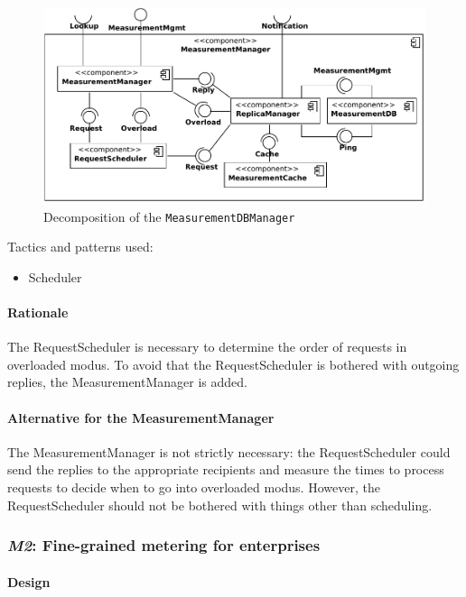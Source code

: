 \documentclass[a4paper,10pt]{article}
\begin{document}
\begin{figure}[!htp]
    \centering
    \includegraphics[width=\textwidth]{Decomposition__MeasurementDBManager}
    \caption{Decomposition of the \texttt{MeasurementDBManager}}\label{fig:dec_measurement}
\end{figure}

\noindent Tactics and patterns used:
\begin{itemize}
	\item Scheduler
\end{itemize}

\paragraph{Rationale} The RequestScheduler is necessary to determine the order of requests in overloaded modus. To avoid that the RequestScheduler is bothered with outgoing replies, the MeasurementManager is added.

\paragraph{Alternative for the MeasurementManager} The MeasurementManager is not strictly necessary: the RequestScheduler could send the replies to the appropriate recipients and measure the times to process requests to decide when to go into overloaded modus. However, the RequestScheduler should not be bothered with things other than scheduling.


\subsubsection{\emph{M2}: Fine-grained metering for enterprises}

\paragraph{Design}
\end{document}
